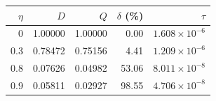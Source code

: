 \begin{ruledtabular}
\begin{tabular}{rrrrr}
$\eta$ & $D$ & $Q$ & $\delta$ (\%) & $\tau$ \\
\hline
0 & 1.00000 & 1.00000 & 0.00 & $1.608\times10^{-6}$ \\
0.3 & 0.78472 & 0.75156 & 4.41 & $1.209\times10^{-6}$ \\
0.8 & 0.07626 & 0.04982 & 53.06 & $8.011\times10^{-8}$ \\
0.9 & 0.05811 & 0.02927 & 98.55 & $4.706\times10^{-8}$ \\
\end{tabular}
\end{ruledtabular}
